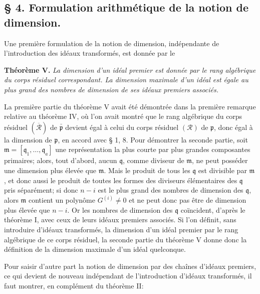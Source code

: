 \providecommand{\frakS}{\mathfrak S}
\providecommand{\fraka}{\mathfrak a}
\providecommand{\frakb}{\mathfrak b}
\providecommand{\frakc}{\mathfrak c}
\providecommand{\frakm}{\mathfrak m}
\providecommand{\frako}{\mathfrak o}
\providecommand{\frakp}{\mathfrak p}
\providecommand{\frakq}{\mathfrak q}

\subsection*{\S{} 4. Formulation arithmétique de la notion de dimension.}

Une première formulation de la notion de dimension, indépendante de l'introduction des idéaux transformés, est donnée par le

\textbf{Théorème V.} \emph{La dimension d'un idéal premier est donnée par le rang algébrique du corps résiduel correspondant. La dimension maximale d'un idéal est égale au plus grand des nombres de dimension de ses idéaux premiers associés.}

La première partie du théorème V avait été démontrée dans la première remarque relative au théorème IV, où l'on avait montré que le rang algébrique du corps résiduel $(\overline{\mathcal R})$ de $\bar{\frakp}$ devient égal à celui du corps résiduel $(\mathcal R)$ de $\frakp$, donc égal à la dimension de $\frakp$, en accord avec \S{} 1, 8. Pour démontrer la seconde partie, soit $\frakm=[\frakq_1,\ldots,\frakq_a]$ une représentation la plus courte par plus grandes composantes primaires; alors, tout d'abord, aucun $\frakq$, comme diviseur de $\frakm$, ne peut posséder une dimension plus élevée que $\frakm$. Mais le produit de tous les $\frakq$ est divisible par $\frakm$, et donc aussi le produit de toutes les formes des diviseurs élémentaires des $\frakq$ pris séparément; si donc $n-i$ est le plus grand des nombres de dimension des $\frakq$, alors $\frakm$ contient un polynôme $G^{(i)}\ne0$ et ne peut donc pas être de dimension plus élevée que $n-i$. Or les nombres de dimension des $\frakq$ coïncident, d'après le théorème I, avec ceux de leurs idéaux premiers associés. Si l'on définit, sans introduire d'idéaux transformés, la dimension d'un idéal premier par le rang algébrique de ce corps résiduel, la seconde partie du théorème V donne donc la définition de la dimension maximale d'un idéal quelconque.

Pour saisir d'autre part la notion de dimension par des chaînes d'idéaux premiers, ce qui devient de nouveau indépendant de l'introduction d'idéaux transformés, il faut montrer, en complément du théorème II:

